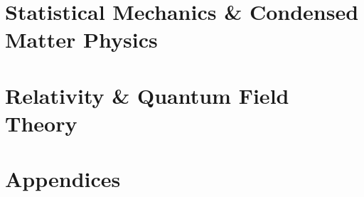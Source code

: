 \documentclass[12pt, a4paper]{report}
\begin{document}
\part{Statistical Mechanics \& Condensed Matter Physics}





\part{Relativity \& Quantum Field Theory}











\part{Appendices}
\begin{appendices}


\end{appendices}


\printnomenclature




\printindex
\end{document}
